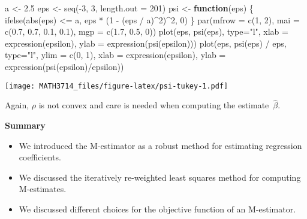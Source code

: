 \documentclass[
  a4paper,
]{article}
\newenvironment{Shaded}{\begin{snugshade}}{\end{snugshade}}
\newcommand{\AttributeTok}[1]{\textcolor[rgb]{0.77,0.63,0.00}{#1}}
\newcommand{\ControlFlowTok}[1]{\textcolor[rgb]{0.13,0.29,0.53}{\textbf{#1}}}
\newcommand{\DecValTok}[1]{\textcolor[rgb]{0.00,0.00,0.81}{#1}}
\newcommand{\FloatTok}[1]{\textcolor[rgb]{0.00,0.00,0.81}{#1}}
\newcommand{\FunctionTok}[1]{\textcolor[rgb]{0.00,0.00,0.00}{#1}}
\newcommand{\NormalTok}[1]{#1}
\newcommand{\OtherTok}[1]{\textcolor[rgb]{0.56,0.35,0.01}{#1}}
\newcommand{\SpecialCharTok}[1]{\textcolor[rgb]{0.00,0.00,0.00}{#1}}
\newcommand{\StringTok}[1]{\textcolor[rgb]{0.31,0.60,0.02}{#1}}
\providecommand{\tightlist}{%
  \setlength{\itemsep}{0pt}\setlength{\parskip}{0pt}}
\theoremstyle{definition}
\theoremstyle{definition}
\theoremstyle{definition}
\theoremstyle{definition}
\theoremstyle{remark}
\begin{document}
\begin{Shaded}
\begin{Highlighting}[]
\NormalTok{a }\OtherTok{\textless{}{-}} \FloatTok{2.5}
\NormalTok{eps }\OtherTok{\textless{}{-}} \FunctionTok{seq}\NormalTok{(}\SpecialCharTok{{-}}\DecValTok{3}\NormalTok{, }\DecValTok{3}\NormalTok{, }\AttributeTok{length.out =} \DecValTok{201}\NormalTok{)}
\NormalTok{psi }\OtherTok{\textless{}{-}} \ControlFlowTok{function}\NormalTok{(eps) \{}
    \FunctionTok{ifelse}\NormalTok{(}\FunctionTok{abs}\NormalTok{(eps) }\SpecialCharTok{\textless{}=}\NormalTok{ a,}
\NormalTok{           eps }\SpecialCharTok{*}\NormalTok{ (}\DecValTok{1} \SpecialCharTok{{-}}\NormalTok{ (eps }\SpecialCharTok{/}\NormalTok{ a)}\SpecialCharTok{\^{}}\DecValTok{2}\NormalTok{)}\SpecialCharTok{\^{}}\DecValTok{2}\NormalTok{,}
           \DecValTok{0}\NormalTok{)}
\NormalTok{\}}
\FunctionTok{par}\NormalTok{(}\AttributeTok{mfrow =} \FunctionTok{c}\NormalTok{(}\DecValTok{1}\NormalTok{, }\DecValTok{2}\NormalTok{),}
    \AttributeTok{mai =} \FunctionTok{c}\NormalTok{(}\FloatTok{0.7}\NormalTok{, }\FloatTok{0.7}\NormalTok{, }\FloatTok{0.1}\NormalTok{, }\FloatTok{0.1}\NormalTok{),}
    \AttributeTok{mgp =} \FunctionTok{c}\NormalTok{(}\FloatTok{1.7}\NormalTok{, }\FloatTok{0.5}\NormalTok{, }\DecValTok{0}\NormalTok{))}
\FunctionTok{plot}\NormalTok{(eps, }\FunctionTok{psi}\NormalTok{(eps), }\AttributeTok{type=}\StringTok{"l"}\NormalTok{,}
     \AttributeTok{xlab =} \FunctionTok{expression}\NormalTok{(epsilon), }\AttributeTok{ylab =} \FunctionTok{expression}\NormalTok{(}\FunctionTok{psi}\NormalTok{(epsilon)))}
\FunctionTok{plot}\NormalTok{(eps, }\FunctionTok{psi}\NormalTok{(eps) }\SpecialCharTok{/}\NormalTok{ eps, }\AttributeTok{type=}\StringTok{"l"}\NormalTok{, }\AttributeTok{ylim =} \FunctionTok{c}\NormalTok{(}\DecValTok{0}\NormalTok{, }\DecValTok{1}\NormalTok{),}
     \AttributeTok{xlab =} \FunctionTok{expression}\NormalTok{(epsilon),}
     \AttributeTok{ylab =} \FunctionTok{expression}\NormalTok{(}\FunctionTok{psi}\NormalTok{(epsilon)}\SpecialCharTok{/}\NormalTok{epsilon))}
\end{Highlighting}
\end{Shaded}

\texttt{[image: MATH3714\_files/figure-latex/psi-tukey-1.pdf]}

Again, \(\rho\) is not convex and care is needed when computing
the estimate~\(\hat\beta\).

\textbf{Summary}

\begin{itemize}
\tightlist
\item
  We introduced the M-estimator as a robust method for estimating regression coefficients.
\item
  We discussed the iteratively re-weighted least squares method for computing M-estimates.
\item
  We discussed different choices for the objective function of an M-estimator.
\end{itemize}
\end{document}
